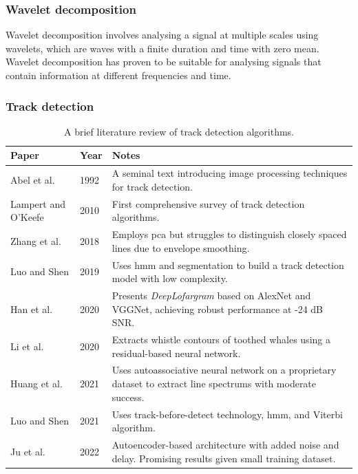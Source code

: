 \subsubsection{Wavelet decomposition}
Wavelet decomposition involves analysing a signal at multiple scales using wavelets, which are waves with a finite duration and time with zero mean. Wavelet decomposition has proven to be suitable for analysing signals that contain information at different frequencies and time.

\subsubsection{Track detection}

\begin{table}
\centering
\caption{A brief literature review of track detection algorithms.}
\label{tab:track-detection-review}
\begin{tabular}{llp{16cm}} %
\toprule
\textbf{Paper} & \textbf{Year} & \textbf{Notes} \\ \midrule
Abel et al. \cite{abel_image_1992} & 1992 & A seminal text introducing image processing techniques for track detection. \\
Lampert and O'Keefe \cite{lampert_survey_2010} & 2010 & First comprehensive survey of track detection algorithms. \\
Zhang et al. \cite{zhang_frequency_2018} & 2018 & Employs \acrshort{pca} but struggles to distinguish closely spaced lines due to envelope smoothing. \\
Luo and Shen \cite{luo_sensing_2019} & 2019 & Uses \acrshort{hmm} and segmentation to build a track detection model with low complexity. \\
Han et al. \cite{han_deeplofargram_2020} & 2020 & Presents \textit{DeepLofargram} based on AlexNet and VGGNet, achieving robust performance at -24 dB SNR.\\
Li et al. \cite{li_learning_2020} & 2020 & Extracts whistle contours of toothed whales using a residual-based neural network. \\
Huang et al. \cite{huang_line_2021} & 2021 & Uses autoassociative neural network on a proprietary dataset to extract line spectrums with moderate success. \\
Luo and Shen \cite{luo_space-frequency_2021} & 2021 & Uses track-before-detect technology, \acrshort{hmm}, and Viterbi algorithm. \\
Ju et al. \cite{ju_deeplearningbased_2022} & 2022 & Autoencoder-based architecture with added noise and delay. Promising results given small training dataset. \\

\end{tabular}
\end{table}

